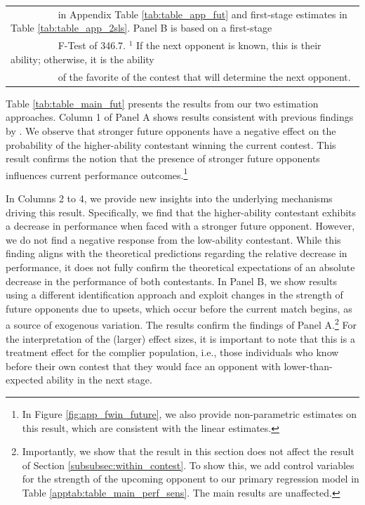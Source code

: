\documentclass[11pt,a4paper]{article}
\begin{document}
\begin{table}[H]
\begin{tabular}{l r r r r r r r}
   			\multicolumn{8}{l}{\footnotesize ~~~~~~~~~    in Appendix Table \ref{tab:table_app_fut} and first-stage estimates in Table \ref{tab:table_app_2sls}. Panel B is based on a first-stage   }\\
         	\multicolumn{8}{l}{\footnotesize ~~~~~~~~~ F-Test of 346.7. $^1$ If the next opponent is known, this is their ability; otherwise, it is the ability }\\
         	\multicolumn{8}{l}{\footnotesize ~~~~~~~~~ of the favorite of the contest that will determine the next opponent.}
		\end{tabular}
	\end{table}

 Table \ref{tab:table_main_fut} presents the results from our two estimation approaches. Column 1 of Panel A shows results consistent with previous findings by . We observe that stronger future opponents have a negative effect on the probability of the higher-ability contestant winning the current contest. This result confirms the notion that the presence of stronger future opponents influences current performance outcomes.\footnote{In Figure \ref{fig:app_fwin_future}, we also provide non-parametric estimates on this result, which are consistent with the linear estimates.}\par

In Columns 2 to 4, we provide new insights into the underlying mechanisms driving this result. Specifically, we find that the higher-ability contestant exhibits a decrease in performance when faced with a stronger future opponent. However, we do not find a negative response from the low-ability contestant. While this finding aligns with the theoretical predictions regarding the relative decrease in performance, it does not fully confirm the theoretical expectations of an absolute decrease in the performance of both contestants. In Panel B, we show results using a different identification approach and exploit changes in the strength of future opponents due to upsets, which occur before the current match begins, as a source of exogenous variation. The results confirm the findings of Panel A.\footnote{Importantly, we show that the result in this section does not affect the result of Section \ref{subsubsec:within_contest}. To show this, we add control variables for the strength of the upcoming opponent to our primary regression model in Table \ref{apptab:table_main_perf_sens}. The main results are unaffected.} For the interpretation of the (larger) effect sizes, it is important to note that this is a treatment effect for the complier population, i.e., those individuals who know before their own contest that they would face an opponent with lower-than-expected ability in the next stage.\par
\end{document}
